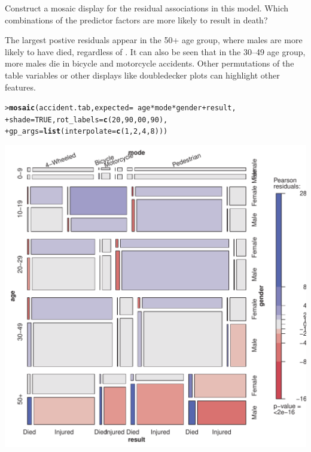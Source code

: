 \documentclass[10pt]{report}\usepackage[]{graphicx}\usepackage[]{color}
\makeatletter
\newcommand{\hlnum}[1]{\textcolor[rgb]{0.686,0.059,0.569}{#1}}%
\newcommand{\hlopt}[1]{\textcolor[rgb]{0,0,0}{#1}}%
\newcommand{\hlstd}[1]{\textcolor[rgb]{0.345,0.345,0.345}{#1}}%
\newcommand{\hlkwc}[1]{\textcolor[rgb]{0.333,0.667,0.333}{#1}}%
\newcommand{\hlkwd}[1]{\textcolor[rgb]{0.737,0.353,0.396}{\textbf{#1}}}%
\newenvironment{kframe}{%
 \def\at@end@of@kframe{}%
 \ifinner\ifhmode%
  \def\at@end@of@kframe{\end{minipage}}%
  \begin{minipage}{\columnwidth}%
 \fi\fi%
 \def\FrameCommand##1{\hskip\@totalleftmargin \hskip-\fboxsep
 \colorbox{shadecolor}{##1}\hskip-\fboxsep
     \hskip-\linewidth \hskip-\@totalleftmargin \hskip\columnwidth}%
 \MakeFramed {\advance\hsize-\width
   \@totalleftmargin\z@ \linewidth\hsize
   \@setminipage}}%
 {\par\unskip\endMakeFramed%
 \at@end@of@kframe}
\newenvironment{knitrout}{}{} %
\renewenvironment{knitrout}{\small\renewcommand{\baselinestretch}{.85}}{} %
\makeatother
\begin{document}
\begin{Exercises}
\begin{enumerate*}
      \item Construct a mosaic display for the residual associations in this model.  Which combinations of the
      predictor factors are more likely to result in death?
      \begin{ans}
      The largest postive residuals appear in the 50+ age group, where males are more likely to have died,
      regardless of .  It can also be seen that in the 30--49 age group, more males die
      in bicycle and motorcycle accidents.  Other permutations of the table variables or
      other displays like doubledecker plots can highlight other features.
\begin{knitrout}\footnotesize
{}\color{fgcolor}\begin{kframe}
\begin{alltt}
\hlstd{> }\hlkwd{mosaic}\hlstd{(accident.tab,} \hlkwc{expected} \hlstd{=} \hlopt{~}\hlstd{age} \hlopt{*} \hlstd{mode} \hlopt{*} \hlstd{gender} \hlopt{+} \hlstd{result,}
\hlstd{+ }       \hlkwc{shade}\hlstd{=}\hlnum{TRUE}\hlstd{,} \hlkwc{rot_labels} \hlstd{=} \hlkwd{c}\hlstd{(}\hlnum{20}\hlstd{,} \hlnum{90}\hlstd{,} \hlnum{00}\hlstd{,} \hlnum{90}\hlstd{),}
\hlstd{+ }       \hlkwc{gp_args}\hlstd{=}\hlkwd{list}\hlstd{(}\hlkwc{interpolate}\hlstd{=}\hlkwd{c}\hlstd{(}\hlnum{1}\hlstd{,}\hlnum{2}\hlstd{,}\hlnum{4}\hlstd{,}\hlnum{8}\hlstd{)))}
\end{alltt}
\end{kframe}

\centerline{\includegraphics[width=.6\textwidth]{soln/fig/ex5_9d-1} }



\end{knitrout}
      \end{ans}
      

\end{enumerate*}
\end{Exercises}
\end{document}
